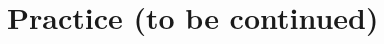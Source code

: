 \documentclass[amsmath,amsfonts,rmp,letterpaper]{revtex4}
\begin{document}

\section{Practice (\textbf{to be continued})\label{part:practice}}



\end{document}
